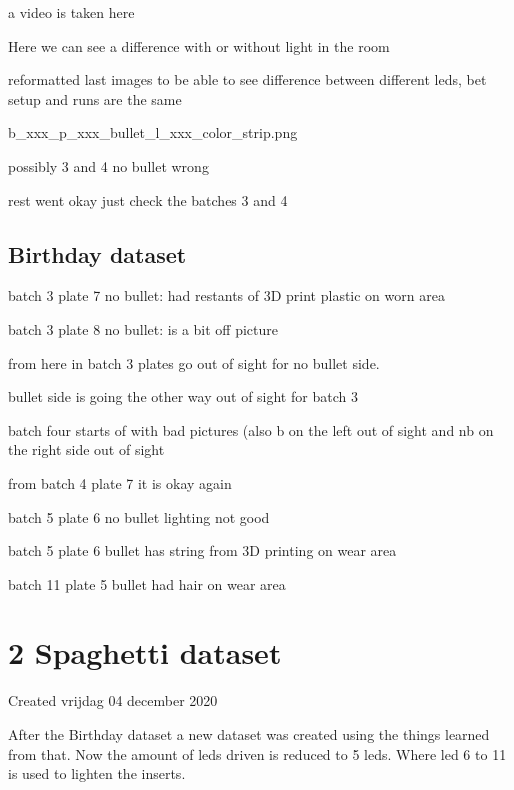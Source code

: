 a video is taken here 

Here we can see a difference with or without light in the room



reformatted last images to be able to see difference between different leds, bet setup and runs are the same

b\_xxx\_p\_xxx\_bullet\_l\_xxx\_color\_strip.png





possibly 3 and 4 no bullet wrong 

rest went okay just check the batches 3 and 4



\subsection{Birthday dataset}

batch 3 plate 7 no bullet:  had restants of 3D print plastic on worn area

batch 3 plate 8 no bullet:  is a bit off picture

from here in batch 3 plates go out of sight for no bullet side. 



bullet side is going the other way out of sight for batch 3 

batch four starts of with bad pictures (also b on the left out of sight and nb on the right side out of sight



from batch 4 plate 7 it is okay again



batch 5 plate 6 no bullet lighting not good

batch 5 plate 6 bullet has string from 3D printing on wear area



batch 11 plate 5 bullet had hair on wear area


		\section{2 Spaghetti dataset}

Created vrijdag 04 december 2020



After the Birthday dataset a new dataset was created using the things learned from that. Now the amount of leds driven is reduced to 5 leds. Where led 6 to 11 is used to lighten the inserts. 

